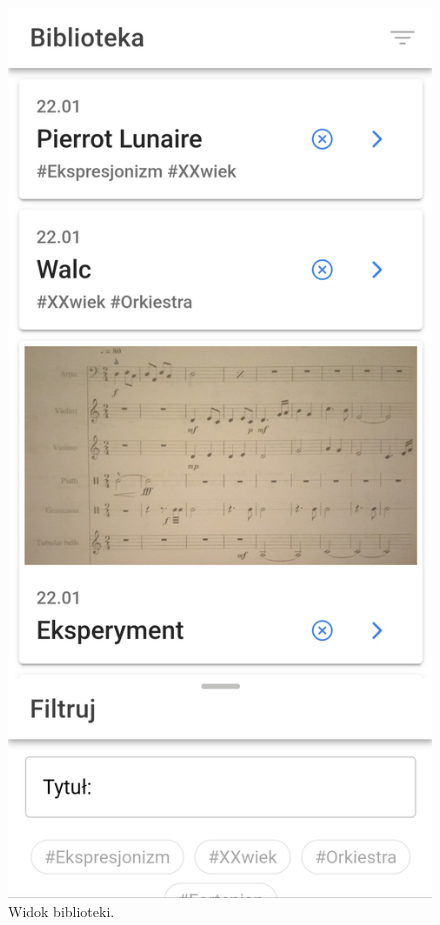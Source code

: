 \begin{figure}[H]
	\begin{center}
		\includegraphics[scale=0.16]{media/LibraryView.jpg}
	\end{center}
	\caption{Widok biblioteki.}
	\label{rys:library-view}
\end{figure}

